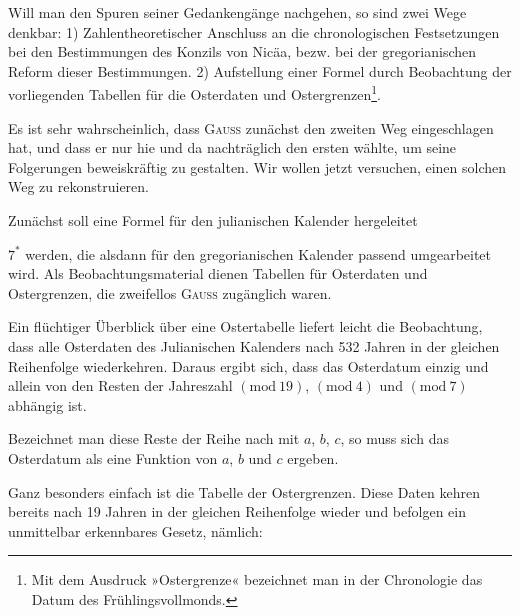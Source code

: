 Will man den Spuren seiner Gedankengänge nachgehen, so sind zwei
Wege denkbar: 1) Zahlentheoretischer Anschluss an die chronologischen Festsetzungen bei den Bestimmungen des Konzils von Nicäa, bezw. bei der gregorianischen Reform dieser Bestimmungen. 2) Aufstellung einer Formel durch
Beobachtung der vorliegenden Tabellen für die Osterdaten und Ostergrenzen\footnote{Mit dem Ausdruck »Ostergrenze« bezeichnet man in der Chronologie das Datum des Frühlingsvollmonds.}.

Es ist sehr wahrscheinlich, dass \textsc{Gauss} zunächst den zweiten Weg eingeschlagen hat, und dass er nur hie und da nachträglich den ersten wählte,
um seine Folgerungen beweiskräftig zu gestalten. Wir wollen jetzt versuchen,
einen solchen Weg zu rekonstruieren.

Zunächst soll eine Formel für den julianischen Kalender hergeleitet
\par\hfill $7^{\ast}$
\clearpage{}
\noindent werden, die alsdann für den gregorianischen Kalender passend umgearbeitet
wird. Als Beobachtungsmaterial dienen Tabellen für Osterdaten und Ostergrenzen, die zweifellos \textsc{Gauss} zugänglich waren.

Ein flüchtiger Überblick über eine Ostertabelle liefert leicht die Beobachtung, dass alle Osterdaten des Julianischen Kalenders nach 532 Jahren in
der gleichen Reihenfolge wiederkehren. Daraus ergibt sich, dass das Osterdatum einzig und allein von den Resten der Jahreszahl $(\mathrm{mod}\ 19)$, $(\mathrm{mod}\ 4)$ und
$(\mathrm{mod}\ 7)$ abhängig ist.

Bezeichnet man diese Reste der Reihe nach mit $a$, $b$, $c$, so muss sich
das Osterdatum als eine Funktion von $a$, $b$ und $c$ ergeben.

Ganz besonders einfach ist die Tabelle der Ostergrenzen. Diese Daten
kehren bereits nach 19 Jahren in der gleichen Reihenfolge wieder und befolgen ein unmittelbar erkennbares Gesetz, nämlich:

